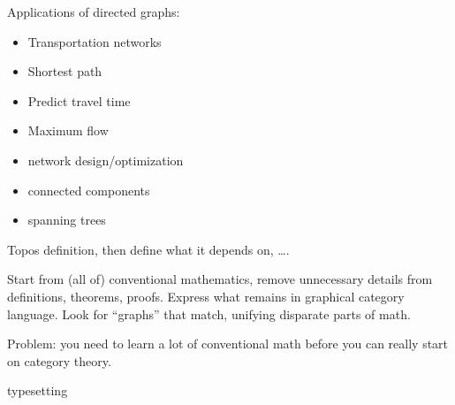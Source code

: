 \documentclass[11pt,openany]{article}
\def \texFolder {../../tex/}
\begin{document}
Applications of directed graphs:~\cite{clrs-2009}
\begin{itemize}
  \item Transportation networks
  \item Shortest path
  \item Predict travel time
  \item Maximum flow
  \item network design/optimization
  \item connected components
  \item spanning trees
\end{itemize}

\label{sec:Category_from_digraph}


\setcounter{currentlevel}{\value{baseSectionLevel}}
\label{sec:Topos-down}
 
Topos definition, then define what it depends on, \ldots.
 
\setcounter{currentlevel}{\value{baseSectionLevel}}
\label{sec:Fusion}

Start from (all of) conventional mathematics,
remove unnecessary details from definitions, theorems, proofs.
Express what remains in graphical category language.
Look for ``graphs'' that match, unifying disparate parts of math.

Problem: you need to learn a lot of conventional math before
you can really start on category theory.

 
\pagebreak
\appendix
{typesetting}


%
\printbibliography[heading=bibintoc, title={References}]
\end{document}
